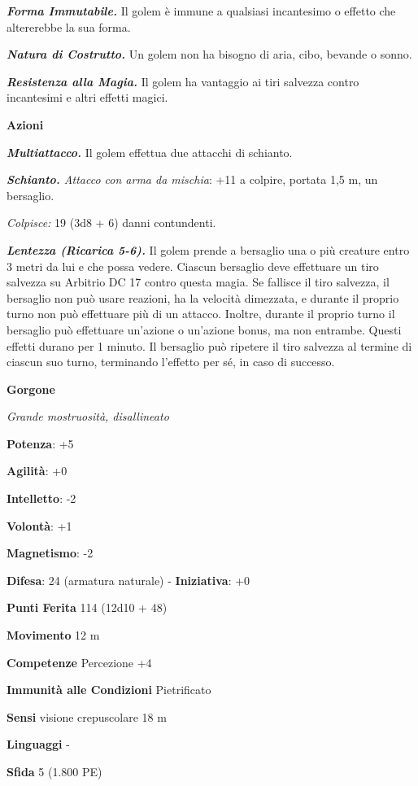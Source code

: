 \begin{multicols}{2}
\emph{\textbf{Forma Immutabile.}} Il golem è immune a qualsiasi
incantesimo o effetto che altererebbe la sua forma.

\emph{\textbf{Natura di Costrutto.}} Un golem non ha bisogno di aria,
cibo, bevande o sonno.

\emph{\textbf{Resistenza alla Magia.}} Il golem ha vantaggio ai tiri
salvezza contro incantesimi e altri effetti magici.

\textbf{Azioni}

\emph{\textbf{Multiattacco.}} Il golem effettua due attacchi di
schianto.

\emph{\textbf{Schianto.} Attacco con arma da mischia}: +11 a colpire,
portata 1,5 m, un bersaglio.

\emph{Colpisce:} 19 (3d8 + 6) danni contundenti.

\emph{\textbf{Lentezza (Ricarica 5-6).}} Il golem prende a bersaglio una
o più creature entro 3 metri da lui e che possa vedere. Ciascun
bersaglio deve effettuare un tiro salvezza su Arbitrio DC 17 contro
questa magia. Se fallisce il tiro salvezza, il bersaglio non può usare
reazioni, ha la velocità dimezzata, e durante il proprio turno non può
effettuare più di un attacco. Inoltre, durante il proprio turno il
bersaglio può effettuare un'azione o un'azione bonus, ma non entrambe.
Questi effetti durano per 1 minuto. Il bersaglio può ripetere il tiro
salvezza al termine di ciascun suo turno, terminando l'effetto per sé,
in caso di successo.

\textbf{Gorgone}

\emph{Grande mostruosità, disallineato}

\textbf{Potenza}: +5

\textbf{Agilità}: +0

\textbf{Intelletto}: -2

\textbf{Volontà}: +1

\textbf{Magnetismo}: -2

\textbf{Difesa}: 24 (armatura naturale) - \textbf{Iniziativa}: +0

\textbf{Punti Ferita} 114 (12d10 + 48)

\textbf{Movimento} 12 m

\textbf{Competenze} Percezione +4

\textbf{Immunità alle Condizioni} Pietrificato

\textbf{Sensi} visione crepuscolare 18 m

\textbf{Linguaggi} -

\textbf{Sfida} 5 (1.800 PE)


\end{multicols}
